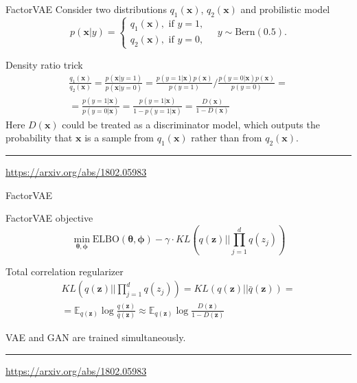 \documentclass{beamer}
\newcommand{\bx}{\mathbf{x}}
\newcommand{\bz}{\mathbf{z}}
\newcommand{\bbE}{\mathbb{E}}
\newcommand{\btheta}{\boldsymbol{\theta}}
\newcommand{\bphi}{\boldsymbol{\phi}}
\begin{document}
\begin{frame}{FactorVAE}
	Consider two distributions $q_1(\bx)$, $q_2(\bx)$ and probilistic model
	\[
		p(\bx | y) = \begin{cases}
			q_1(\bx), \text{ if } y = 1, \\
			q_2(\bx), \text{ if } y = 0,
		\end{cases}
		\quad 
		y \sim \text{Bern}(0.5).
	\]
	\begin{block}{Density ratio trick}
		\vspace{-0.5cm}
		\begin{multline*}
			\frac{q_1(\bx)}{q_2(\bx)} = \frac{p(\bx | y = 1)}{p(\bx | y = 0)} = \frac{p(y = 1 | \bx) p(\bx)}{p(y=1)} \bigg/ \frac{p(y = 0 | \bx) p(\bx)}{p(y=0)} = \\
			= \frac{p(y = 1 | \bx)}{p(y = 0 | \bx)} = \frac{p(y = 1 | \bx)}{1 - p(y = 1 | \bx)} = \frac{D(\bx)}{1 - D(\bx)}
		\end{multline*}
	Here $D(\bx)$ could be treated as a discriminator model, which outputs the probability that $\bx$ is a sample
	from $q_1(\bx)$ rather than from $q_2(\bx)$.
	\end{block}
	
	\vfill
	\hrule\medskip
	{\scriptsize \href{https://arxiv.org/abs/1802.05983}{https://arxiv.org/abs/1802.05983}}
\end{frame}
\begin{frame}{FactorVAE}
	
	\begin{block}{FactorVAE objective}
		\vspace{-0.3cm}
		\[
		\min_{\btheta, \bphi} \text{ELBO}(\btheta, \bphi) - \gamma \cdot KL(q(\bz) || \prod_{j=1}^d q(z_j))
		\]
		\vspace{-0.3cm}
	\end{block}
	
	\begin{block}{Total correlation regularizer}
		\vspace{-0.7cm}
		\begin{multline*}
		KL(q(\bz) || \prod_{j=1}^d q(z_j)) = KL(q(\bz) || \bar{q}(\bz)) = \\ =\bbE_{q(\bz)} \log \frac{q(\bz)}{\bar{q}(\bz)} \approx \bbE_{q(\bz)} \log \frac{D(\bz)}{1 - D(\bz)}
		\end{multline*}
		\vspace{-0.3cm}
	\end{block}
	VAE and GAN are trained simultaneously.
	
	\vfill
	\hrule\medskip
	{\scriptsize \href{https://arxiv.org/abs/1802.05983}{https://arxiv.org/abs/1802.05983}}
\end{frame}
\end{document}
